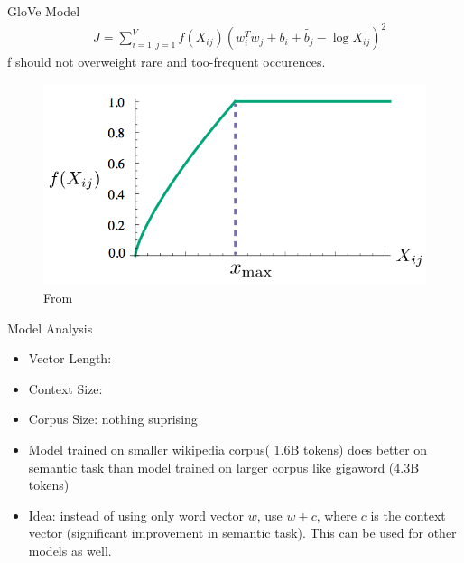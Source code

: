 \begin{frame}{GloVe Model}
  \begin{align*}
  & J = \sum_{i=1,j=1}^V f(X_{ij}) \left( w_i^T\tilde{w_j} +b_i + \tilde{b_j} - \log X_{ij} \right)^2
  \end{align*}
  f should not overweight rare and too-frequent occurences.
    \begin{figure}
      \includegraphics[scale=0.27]{images/weighting.png}
      \caption{From}
    \end{figure}
\end{frame}


\begin{frame}{Model Analysis}
  \begin{itemize}
  \item Vector Length:
  \item Context Size: 
  \item Corpus Size: nothing suprising
  \item Model trained on smaller wikipedia corpus( 1.6B tokens) does better on semantic task than model trained on larger corpus like gigaword (4.3B tokens)
  \item Idea: instead of using only word vector $w$, use $w+c$, where $c$ is the context vector (significant improvement in semantic task). This can be used for other models as well.
  \end{itemize}
\end{frame}


